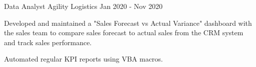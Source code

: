 \begin{cventries}
  \cventry
    {Data Analyst} %
    {Agility Logistics} %
    {Jan 2020 - Nov 2020} %
    {} %
    {
      \begin{cvitems} %
        \item {Developed and maintained a "Sales Forecast vs Actual Variance" dashboard with the sales team to compare sales forecast to actual sales from the CRM system and track sales performance.}
        \item {Automated regular KPI reports using VBA macros.}
      \end{cvitems}
    }

\end{cventries}
